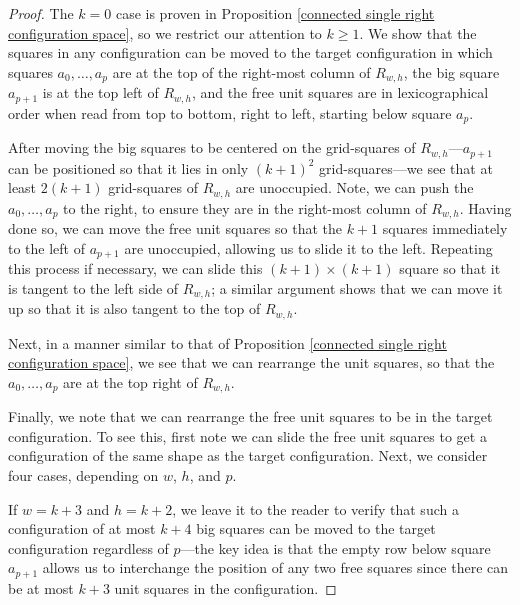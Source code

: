 \documentclass[pagebackref,colorlinks,citecolor=blue,linkcolor=blue,urlcolor=blue,filecolor=blue]{article}
\theoremstyle{definition}\newtheorem{definition}[thm]{Definition}
\theoremstyle{definition}
\begin{document}
\begin{proof}
The $k=0$ case is proven in Proposition \ref{connected single right configuration space}, so we restrict our attention to $k\ge 1$.
We show that the squares in any configuration can be moved to the target configuration in which squares $a_{0},\dots, a_{p}$ are at the top of the right-most column of $R_{w,h}$, the big square $a_{p+1}$ is at the top left of $R_{w,h}$, and the free unit squares are in lexicographical order when read from top to bottom, right to left, starting below square $a_{p}$.

After moving the big squares to be centered on the grid-squares of $R_{w,h}$---$a_{p+1}$ can be positioned so that it lies in only $(k+1)^{2}$ grid-squares---we see that at least $2(k+1)$ grid-squares of $R_{w,h}$ are unoccupied.
Note, we can push the $a_{0}, \dots, a_{p}$ to the right, to ensure they are in the right-most column of $R_{w,h}$.
Having done so, we can move the free unit squares so that the $k+1$ squares immediately to the left of $a_{p+1}$ are unoccupied, allowing us to slide it to the left.
Repeating this process if necessary, we can slide this $(k+1)\times (k+1)$ square so that it is tangent to the left side of $R_{w,h}$; a similar argument shows that we can move it up so that it is also tangent to the top of $R_{w,h}$. 

Next, in a manner similar to that of Proposition \ref{connected single right configuration space}, we see that we can rearrange the unit squares, so that the $a_{0},\dots, a_{p}$ are at the top right of $R_{w,h}$.

Finally, we note that we can rearrange the free unit squares to be in the target configuration.
To see this, first note we can slide the free unit squares to get a configuration of the same shape as the target configuration.
Next, we consider four cases, depending on $w$, $h$, and $p$.

If $w=k+3$ and $h=k+2$, we leave it to the reader to verify that such a configuration of at most $k+4$ big squares can be moved to the target configuration regardless of $p$---the key idea is that the empty row below square $a_{p+1}$ allows us to interchange the position of any two free squares since there can be at most $k+3$ unit squares in the configuration. 


\end{proof}
\end{document}
